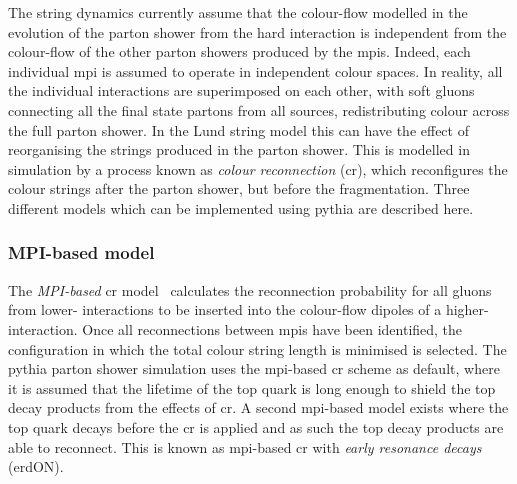 The string dynamics currently assume that the colour-flow modelled in the evolution of the parton shower from the hard interaction is independent from the colour-flow of the other parton showers produced by the \acrshort{mpi}s.
Indeed, each individual \acrshort{mpi} is assumed to operate in independent colour spaces.
In reality, all the individual interactions are superimposed on each other, with soft gluons connecting all the final state partons from all sources, redistributing colour across the full parton shower.
In the Lund string model this can have the effect of reorganising the strings produced in the parton shower.
This is modelled in simulation by a process known as \textit{colour reconnection} (\acrshort{cr}), which reconfigures the colour strings after the parton shower, but before the fragmentation.
Three different models which can be implemented using \acrshort{pythia} are described here.

\subsubsection{MPI-based model} %
\label{sub:mpi_based_model}

The \textit{MPI-based} \acrshort{cr} model~\cite{Gen:GluonMove} calculates the reconnection probability for all gluons from lower-\pt{} interactions to be inserted into the colour-flow dipoles of a higher-\pt{} interaction.
Once all reconnections between \acrshort{mpi}s have been identified, the configuration in which the total colour string length is minimised is selected.
The \acrshort{pythia} parton shower simulation uses the \acrshort{mpi}-based \acrshort{cr} scheme as default, where it is assumed that the lifetime of the top quark is long enough to shield the top decay products from the effects of \acrshort{cr}.
A second \acrshort{mpi}-based model exists where the top quark decays before the \acrshort{cr} is applied and as such the top decay products are able to reconnect.
This is known as \acrshort{mpi}-based \acrshort{cr} with \textit{early resonance decays} (erdON).


